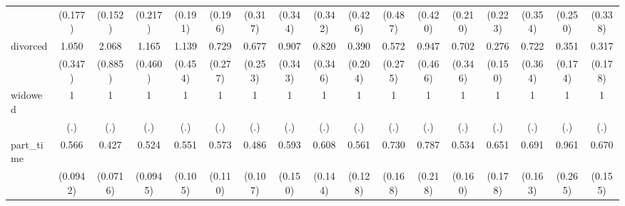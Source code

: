 {\begin{tabular}{l*{16}{c}}
                    &     (0.177)         &     (0.152)         &     (0.217)         &     (0.191)         &     (0.196)         &     (0.317)         &     (0.344)         &     (0.342)         &     (0.426)         &     (0.487)         &     (0.420)         &     (0.210)         &     (0.223)         &     (0.354)         &     (0.250)         &     (0.338)         \\
[1em]
divorced            &       1.050         &       2.068         &       1.165         &       1.139         &       0.729         &       0.677         &       0.907         &       0.820         &       0.390         &       0.572         &       0.947         &       0.702         &       0.276\sym{*}  &       0.722         &       0.351\sym{*}  &       0.317\sym{*}  \\
                    &     (0.347)         &     (0.885)         &     (0.460)         &     (0.454)         &     (0.277)         &     (0.253)         &     (0.343)         &     (0.346)         &     (0.204)         &     (0.275)         &     (0.466)         &     (0.346)         &     (0.150)         &     (0.364)         &     (0.174)         &     (0.178)         \\
[1em]
widowed             &           1         &           1         &           1         &           1         &           1         &           1         &           1         &           1         &           1         &           1         &           1         &           1         &           1         &           1         &           1         &           1         \\
                    &         (.)         &         (.)         &         (.)         &         (.)         &         (.)         &         (.)         &         (.)         &         (.)         &         (.)         &         (.)         &         (.)         &         (.)         &         (.)         &         (.)         &         (.)         &         (.)         \\
[1em]
part\_time           &       0.566\sym{***}&       0.427\sym{***}&       0.524\sym{***}&       0.551\sym{**} &       0.573\sym{**} &       0.486\sym{**} &       0.593\sym{*}  &       0.608\sym{*}  &       0.561\sym{*}  &       0.730         &       0.787         &       0.534\sym{*}  &       0.651         &       0.691         &       0.961         &       0.670         \\
                    &    (0.0942)         &    (0.0716)         &    (0.0945)         &     (0.105)         &     (0.110)         &     (0.107)         &     (0.150)         &     (0.144)         &     (0.128)         &     (0.168)         &     (0.218)         &     (0.160)         &     (0.178)         &     (0.163)         &     (0.265)         &     (0.155)         \\

\end{tabular}}
